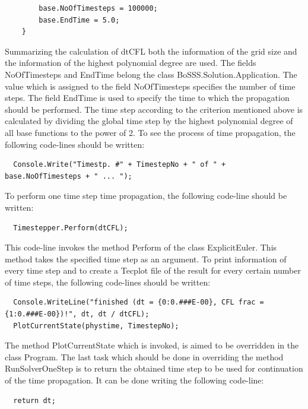 \documentclass[11pt,twoside,a4paper]{fdyartcl}
\begin{document}
{{\begin{verbatim}
		base.NoOfTimesteps = 100000;
		base.EndTime = 5.0;
	}
	\end{verbatim}}
Summarizing the calculation of {\scriptsize dtCFL} both the information of the grid size and the information of the highest polynomial degree are used.
The fields {\scriptsize NoOfTimesteps} and {\scriptsize EndTime} belong the class {\scriptsize BoSSS.Solution.Application}. The value which is assigned to the field {\scriptsize NoOfTimesteps} specifies the number of time steps. The field {\scriptsize EndTime} is used to specify the time to which the propagation should be performed. The time step according to the criterion mentioned above is calculated by dividing the global time step by the highest polynomial degree of all base functions to the power of 2. To see the process of time propagation, the following code-lines should be written:
{\scriptsize \begin{verbatim}
  Console.Write("Timestp. #" + TimestepNo + " of " + base.NoOfTimesteps + " ... ");
\end{verbatim}}
To perform one time step time propagation, the following code-line should be written:
{\scriptsize \begin{verbatim}
  Timestepper.Perform(dtCFL);
\end{verbatim}}
This code-line invokes the method {\scriptsize Perform} of the class {\scriptsize ExplicitEuler}. This method takes the specified time step as an argument.
To print information of every time step and to create a Tecplot file of the result for every certain number of time steps, the following code-lines should be written:
{\scriptsize \begin{verbatim}
  Console.WriteLine("finished (dt = {0:0.###E-00}, CFL frac = {1:0.###E-00})!", dt, dt / dtCFL);
  PlotCurrentState(phystime, TimestepNo);
\end{verbatim}}
The method {\scriptsize PlotCurrentState} which is invoked, is aimed to be overridden in the class {\scriptsize Program}. The last task which should be done in overriding the method {\scriptsize RunSolverOneStep} is to return the obtained time step to be used for continuation of the time propagation. It can be done writing the following code-line:
{\scriptsize \begin{verbatim}
  return dt;
\end{verbatim}}
}
\end{document}
